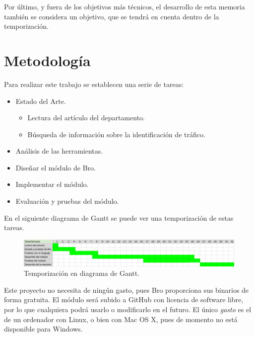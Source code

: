 \intro Por último, y fuera de los objetivos más técnicos, el desarrollo de esta memoria también se 
considera un objetivo, que se tendrá en cuenta dentro de la temporización.

\section{Metodología}

Para realizar este trabajo se establecen una serie de tareas:

\begin{itemize}
\item Estado del Arte.
	\begin{itemize}
	\item Lectura del artículo del departamento. \cite{comparacion}
	\item Búsqueda de información sobre la identificación de tráfico.
	\end{itemize}
\item Análisis de las herramientas.
\item Diseñar el módulo de Bro.
\item Implementar el módulo.
\item Evaluación y pruebas del módulo.
\end{itemize}


\intro En el siguiente diagrama de Gantt se puede ver una temporización de estas tareas. 

\begin{figure}[H]
  \includegraphics[width=1\textwidth]{imagenes/temporizacion.png} 
  \centering
  \caption{Temporización en diagrama de Gantt.}
\end{figure}

Este proyecto no necesita de ningún gasto, pues Bro \cite{broindex} proporciona sus binarios de 
forma gratuita. El módulo será subido a GitHub \cite{repo} con licencia de software libre, por lo que cualquiera 
podrá usarlo o modificarlo en el futuro. El único \textit{gasto} es el de un ordenador con Linux, 
o bien con Mac OS X, pues de momento no está disponible para Windows. \cite{brodownload}

